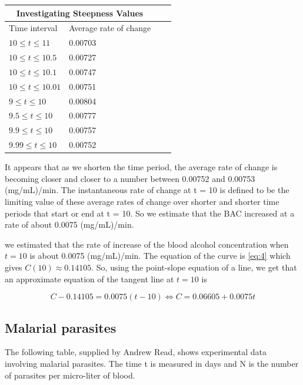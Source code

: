 \begin{center}
	\begin{tabular}{ |p{3cm}||p{3cm}|p{3cm}|p{3cm}|}
 		\hline
 		\multicolumn{2}{|c|}{Investigating Steepness Values} \\
		\hline
 		Time interval & Average rate of change\\
		\hline
 		$10 \leq t \leq 11$    & 0.00703\\
 		$10 \leq t \leq 10.5$  & 0.00727\\
 		$10 \leq t \leq 10.1$  & 0.00747\\
 		$10 \leq t \leq 10.01$ & 0.00751 \\
 		$9 \leq t \leq 10$     & 0.00804\\
 		$9.5 \leq t \leq 10$   & 0.00777\\
 		$9.9 \leq t \leq 10$   & 0.00757\\
 		$9.99 \leq t \leq 10$  & 0.00752\\
 		\hline
	\end{tabular}
\end{center}


\begin{flushleft}
It appears that as we shorten the time period, the average rate of change is becoming closer and closer to a number between 0.00752 and 0.00753 (mg/mL)/min. The instantaneous rate of change at t = 10 is defined to be the limiting value of these average rates of change over shorter and shorter time periods that start or end at t = 10. So we estimate that the BAC increased at a rate of about 0.0075 (mg/mL)/min.

we estimated that the rate of increase of the blood alcohol concentration when $t = 10$ is about 0.0075 (mg/mL)/min. The equation of the curve is \ref{eq:4} which gives $C(10) \approx 0.14105$. So, using the point-slope equation of a line, we get that an approximate equation of the tangent line at $t=10$ is 
\end{flushleft}

\begin{equation}
\label{eq:5}
C - 0.14105 = 0.0075(t - 10)
\Leftrightarrow C = 0.06605 + 0.0075t
\end{equation}

\subsection{Malarial parasites}
The following table, supplied by Andrew Read, shows experimental data involving malarial parasites. The time t is measured in days and N is the number of parasites per micro-liter of blood.

